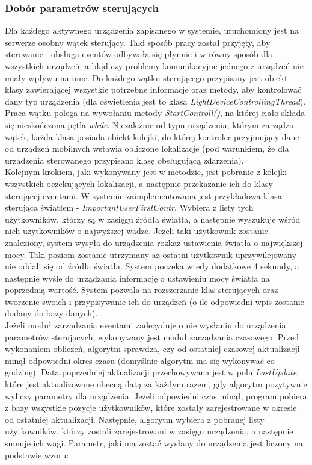 \subsubsection{Dobór parametrów sterujących}
Dla każdego aktywnego urządzenia zapisanego w systemie, uruchomiony jest na serwerze osobny wątek sterujący. Taki sposób pracy został przyjęty, aby sterowanie i obsługa eventów odbywała się płynnie i w równy sposób dla wszystkich urządzeń, a błąd czy problemy komunikacyjne jednego z urządzeń nie miały wpływu na inne. Do każdego wątku sterującego przypisany jest obiekt klasy zawierającej wszystkie potrzebne informacje oraz metody, aby kontrolować dany typ urządzenia (dla oświetlenia jest to klasa \textit{LightDeviceControllingThread}).\\
Praca wątku polega na wywołaniu metody \textit{StartControll()}, na której ciało składa się nieskończona pętla \textit{while}. Niezależnie od typu urządzenia, którym zarządza wątek, każda klasa posiada obiekt kolejki, do której kontroler przyjmujący dane od urządzeń mobilnych wstawia obliczone lokalizacje (pod warunkiem, że dla urządzenia sterowanego przypisano klasę obsługującą zdarzenia).\\
Kolejnym krokiem, jaki wykonywany jest w metodzie, jest pobranie z kolejki wszystkich oczekujących lokalizacji, a następnie przekazanie ich do klasy sterującej eventami. W systemie zaimplementowana jest przykładowa klasa sterująca światłem - \textit{ImportantUserFirstContr}. Wybiera z listy tych użytkowników, którzy są w zasięgu źródła światła, a następnie wyszukuje wśród nich użytkowników o najwyższej wadze. Jeżeli taki użytkownik zostanie znaleziony, system wysyła do urządzenia rozkaz ustawienia światła o największej mocy. Taki poziom zostanie utrzymany aż ostatni użytkownik uprzywilejowany nie oddali się od źródła światła. System poczeka wtedy dodatkowe 4 sekundy, a następnie wyśle do urządzania informację o ustawieniu mocy światła na poprzednią wartość. System pozwala na rozszerzanie klas sterujących oraz tworzenie swoich i przypisywanie ich do urządzeń (o ile odpowiedni wpis zostanie dodany do bazy danych).\\
Jeżeli moduł zarządzania eventami zadecyduje o nie wysłaniu do urządzenia parametrów sterujących, wykonywany jest moduł zarządzania czasowego. Przed wykonaniem obliczeń, algorytm sprawdza, czy od ostatniej czasowej aktualizacji minął odpowiedni okres czasu (domyślnie algorytm ma się wykonywać co godzinę). Data poprzedniej aktualizacji przechowywana jest w polu \textit{LastUpdate}, które jest aktualizowane obecną datą za każdym razem, gdy algorytm pozytywnie wyliczy parametry dla urządzenia. Jeżeli odpowiedni czas minął, program pobiera z bazy wszystkie pozycje użytkowników, które zostały zarejestrowane w okresie od ostatniej aktualizacji. Następnie, algorytm wybiera z pobranej listy użytkowników, którzy zostali zarejestrowani w zasięgu urządzenia, a następnie sumuje ich wagi. Parametr, jaki ma zostać wysłany do urządzenia jest liczony na podstawie wzoru:
